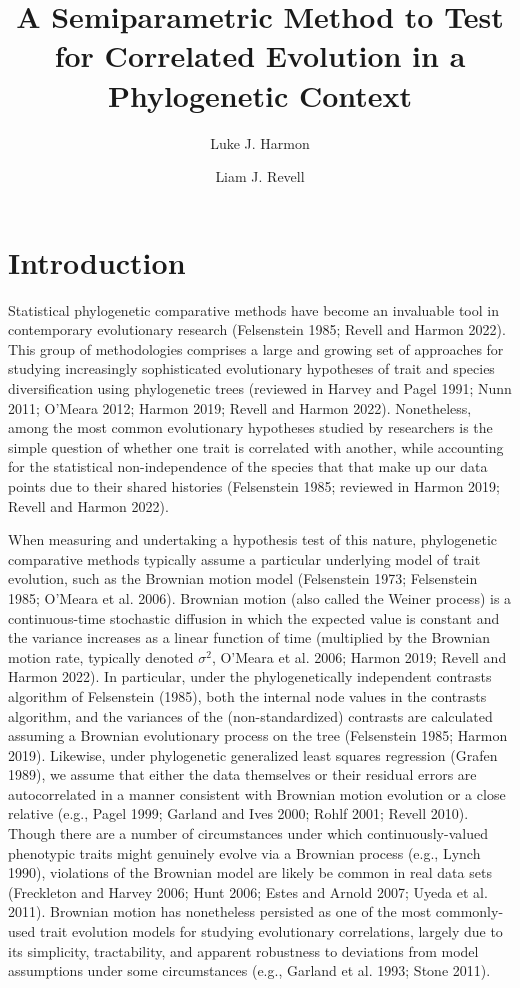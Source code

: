 \documentclass[fleqn,10pt,lineno]{wlpeerj} %
\title{A Semiparametric Method to Test for Correlated Evolution in a Phylogenetic Context}
\author[1]{Luke J. Harmon}
\author[2]{Liam J. Revell}
\affil[1]{Department of Biological Sciences, University of Idaho, Moscow, ID, USA}
\affil[2]{Department of Biology, University of Massachusetts Boston, Boston, MA, USA}
\begin{document}
\flushbottom
\maketitle
\thispagestyle{empty}

\section{Introduction}\label{introduction}

Statistical phylogenetic comparative methods have become an invaluable tool in contemporary evolutionary research (Felsenstein 1985; Revell and Harmon 2022). This group of methodologies comprises a large and growing set of approaches for studying increasingly sophisticated evolutionary hypotheses of trait and species diversification using phylogenetic trees (reviewed in Harvey and Pagel 1991; Nunn 2011; O'Meara 2012; Harmon 2019; Revell and Harmon 2022). Nonetheless, among the most common evolutionary hypotheses studied by researchers is the simple question of whether one trait is correlated with another, while accounting for the statistical non-independence of the species that that make up our data points due to their shared histories (Felsenstein 1985; reviewed in Harmon 2019; Revell and Harmon 2022).

When measuring and undertaking a hypothesis test of this nature, phylogenetic comparative methods typically assume a particular underlying model of trait evolution, such as the Brownian motion model (Felsenstein 1973; Felsenstein 1985; O'Meara et al. 2006). Brownian motion (also called the Weiner process) is a continuous-time stochastic diffusion in which the expected value is constant and the variance increases as a linear function of time (multiplied by the Brownian motion rate, typically denoted \(\sigma^2\), O'Meara et al. 2006; Harmon 2019; Revell and Harmon 2022). In particular, under the phylogenetically independent contrasts algorithm of Felsenstein (1985), both the internal node values in the contrasts algorithm, and the variances of the (non-standardized) contrasts are calculated assuming a Brownian evolutionary process on the tree (Felsenstein 1985; Harmon 2019). Likewise, under phylogenetic generalized least squares regression (Grafen 1989), we assume that either the data themselves or their residual errors are autocorrelated in a manner consistent with Brownian motion evolution or a close relative (e.g., Pagel 1999; Garland and Ives 2000; Rohlf 2001; Revell 2010). Though there are a number of circumstances under which continuously-valued phenotypic traits might genuinely evolve via a Brownian process (e.g., Lynch 1990), violations of the Brownian model are likely be common in real data sets (Freckleton and Harvey 2006; Hunt 2006; Estes and Arnold 2007; Uyeda et al. 2011). Brownian motion has nonetheless persisted as one of the most commonly-used trait evolution models for studying evolutionary correlations, largely due to its simplicity, tractability, and apparent robustness to deviations from model assumptions under some circumstances (e.g., Garland et al. 1993; Stone 2011).
\end{document}
